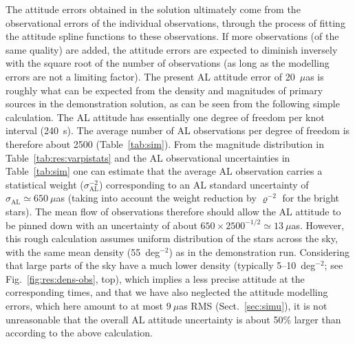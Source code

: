 \documentclass[structabstract]{aa}
\begin{document}
The attitude errors obtained in the solution ultimately come from the observational
errors of the individual observations, through the process of fitting the attitude
spline functions to these observations. If more observations (of the same quality)
are added, the attitude errors are expected to diminish inversely with the square
root of the number of observations (as long as the modelling errors are not a
limiting factor). The present AL attitude error of 20~$\mu$as is roughly what can 
be expected from the density and magnitudes of primary sources in the demonstration
solution, as can be seen from the following simple calculation. The AL attitude has 
essentially one degree of freedom per knot interval (240~s). The average number of 
AL observations per degree of freedom is therefore about 2500 (Table~\ref{tab:sim}). 
From the magnitude distribution in Table~\ref{tab:res:varpistats} and the AL 
observational uncertainties in Table~\ref{tab:sim} one can estimate that the 
average AL observation carries a statistical weight ($\sigma_\text{AL}^{-2}$) 
corresponding to an AL standard uncertainty of $\sigma_\text{AL}\simeq 650~\mu$as 
(taking into account the weight reduction by $\varrho^{-2}$ for the bright stars). 
The mean
flow of observations therefore should allow the AL attitude to be pinned down 
with an uncertainty of about $650\times 2500^{-1/2}\simeq 13~\mu$as. 
However, 
this rough calculation assumes uniform distribution of the stars across the sky,
with the same mean density (55~deg$^{-2}$) as in the demonstration run.
Considering that large parts of the sky have a much lower density (typically
5--10~deg$^{-2}$; see Fig.~\ref{fig:res:dens-obs}, top), which implies a less
precise attitude at the corresponding times, and that we have also 
neglected the attitude modelling errors, which here amount to at most $9~\mu$as 
RMS (Sect.~\ref{sec:simu}), it is not unreasonable that the
overall AL attitude uncertainty is about 50\% larger than according to 
the above calculation.
\end{document}
